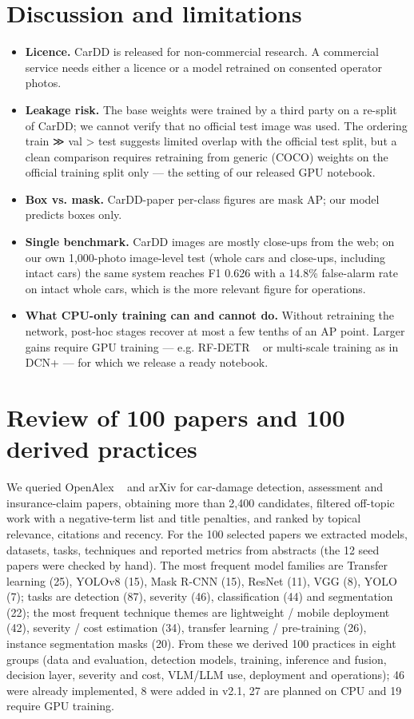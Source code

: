 \documentclass[10pt,twocolumn]{article}
\begin{document}
\section{Discussion and limitations}
\begin{itemize}\item \textbf{Licence.} CarDD is released for non-commercial research. A commercial service needs either a licence or a model retrained on consented operator photos.
\item \textbf{Leakage risk.} The base weights were trained by a third party on a re-split of CarDD; we cannot verify that no official test image was used. The ordering train ≫ val > test suggests limited overlap with the official test split, but a clean comparison requires retraining from generic (COCO) weights on the official training split only --- the setting of our released GPU notebook.
\item \textbf{Box vs. mask.} CarDD-paper per-class figures are mask AP; our model predicts boxes only.
\item \textbf{Single benchmark.} CarDD images are mostly close-ups from the web; on our own 1,000-photo image-level test (whole cars and close-ups, including intact cars) the same system reaches F1 0.626 with a 14.8\% false-alarm rate on intact whole cars, which is the more relevant figure for operations.
\item \textbf{What CPU-only training can and cannot do.} Without retraining the network, post-hoc stages recover at most a few tenths of an AP point. Larger gains require GPU training --- e.g. RF-DETR ~\cite{rfdetr} or multi-scale training as in DCN+ --- for which we release a ready notebook.
\end{itemize}
\section{Review of 100 papers and 100 derived practices}
We queried OpenAlex ~\cite{openalex} and arXiv for car-damage detection, assessment and insurance-claim papers, obtaining more than 2,400 candidates, filtered off-topic work with a negative-term list and title penalties, and ranked by topical relevance, citations and recency. For the 100 selected papers we extracted models, datasets, tasks, techniques and reported metrics from abstracts (the 12 seed papers were checked by hand). The most frequent model families are Transfer learning (25), YOLOv8 (15), Mask R-CNN (15), ResNet (11), VGG (8), YOLO (7); tasks are detection (87), severity (46), classification (44) and segmentation (22); the most frequent technique themes are lightweight / mobile deployment (42), severity / cost estimation (34), transfer learning / pre-training (26), instance segmentation masks (20). From these we derived 100 practices in eight groups (data and evaluation, detection models, training, inference and fusion, decision layer, severity and cost, VLM/LLM use, deployment and operations); 46 were already implemented, 8 were added in v2.1, 27 are planned on CPU and 19 require GPU training.
\end{document}
